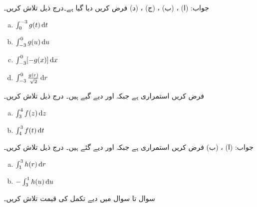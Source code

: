 جواب:\quad
(ا) ، (ب) ، (ج) ، (د)  
فرض کریں  دیا گیا ہے۔درج ذیل تلاش کریں۔
\begin{multicols}{4}
\begin{enumerate}[a.]
\item
$\int_0^{-3}g(t)\dif t$
\item
$\int_{-3}^0g(u)\dif u$
\item
$\int_{-3}^0[-g(x)]\dif x$
\item
$\int_{-3}^0\tfrac{g(r)}{\sqrt{2}}\dif r$
\end{enumerate}
\end{multicols}
فرض کریں  استمراری ہے جبکہ   اور  دیے گیے ہیں۔ درج ذیل تلاش کریں۔
\begin{multicols}{2}
\begin{enumerate}[a.]
\item
$\int_3^4f(z)\dif z$
\item
$\int_4^3f(t)\dif t$
\end{enumerate}
\end{multicols}
جواب:\quad 
(ا) ، (ب) 
فرض کریں  استمراری ہے جبکہ  اور  دیے گئے ہیں۔ درج ذیل تلاش کریں۔ 
\begin{multicols}{2}
\begin{enumerate}[a.]
\item
$\int_1^3h(r)\dif r$
\item
$-\int_3^1h(u)\dif u$
\end{enumerate}
\end{multicols}
سوال  تا سوال  میں دیے تکمل کی قیمت تلاش کریں۔

